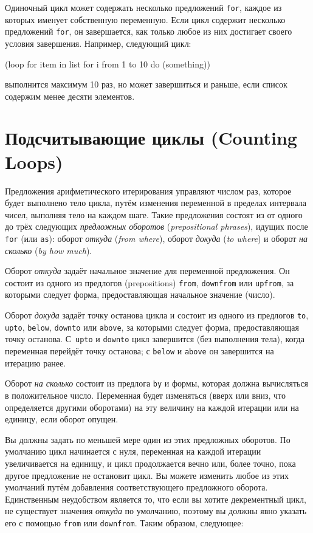 Одиночный цикл может содержать несколько предложений \lstinline{for}, каждое из которых именует
собственную переменную. Если цикл содержит несколько предложений \lstinline{for}, он
завершается, как только любое из них достигает своего условия завершения. Например,
следующий цикл:

\begin{myverb}
(loop
  for item in list
  for i from 1 to 10
  do (something))
\end{myverb}

выполнится максимум 10 раз, но может завершиться и раньше, если список содержим менее
десяти элементов.

\section{Подсчитывающие циклы (Counting Loops)}

Предложения арифметического итерирования управляют числом раз, которое будет выполнено
тело цикла, путём изменения переменной в пределах интервала чисел, выполняя тело на каждом
шаге. Такие предложения состоят из от одного до трёх сле\-дую\-щих \textit{предложных
  оборотов} (\textit{prepositional phrases}), идущих после \lstinline{for} (или \lstinline{as}):
оборот \textit{откуда} (\textit{from where}), оборот \textit{докуда} (\textit{to where}) и
оборот \textit{на сколько} (\textit{by how much}).

Оборот \textit{откуда} задаёт начальное значение для переменной предложения. Он состоит из
одного из предлогов (prepositions) \lstinline{from}, \lstinline{downfrom} или \lstinline{upfrom}, за
которыми следует форма, предоставляющая начальное значение (число).

Оборот \textit{докуда} задаёт точку останова цикла и состоит из одного из предлогов
\lstinline{to}, \lstinline{upto}, \lstinline{below}, \lstinline{downto} или \lstinline{above}, за которыми следует
форма, предоставляющая точку останова. С~\lstinline{upto} и \lstinline{downto} цикл завершится (без
выполнения тела), когда переменная перейдёт точку останова; с \lstinline{below} и \lstinline{above}
он завершится на итерацию ранее.

Оборот \textit{на сколько} состоит из предлога \lstinline{by} и формы, которая должна
вычисляться в положительное число. Переменная будет изменяться (вверх или вниз, что
определяется другими оборотами) на эту величину на каждой итерации или на единицу, если
оборот опущен.

Вы должны задать по меньшей мере один из этих предложных оборотов. По умолчанию цикл
начинается с нуля, переменная на каждой итерации увеличивается на единицу, и цикл
продолжается вечно или, более точно, пока другое предложение не остановит цикл. Вы можете
изменить любое из этих умолчаний путём добавления соответствующего предложного
оборота. Единственным неудобством является то, что если вы хотите декрементный цикл, не
существует значения \textit{откуда} по умолчанию, поэтому вы должны явно указать его с
помощью \lstinline{from} или \lstinline{downfrom}. Таким образом, следующее:

